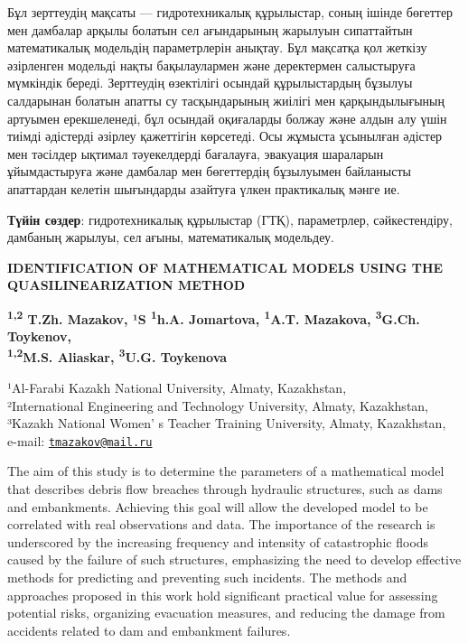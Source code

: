 Бұл зерттеудің мақсаты --- гидротехникалық құрылыстар, соның ішінде
бөгеттер мен дамбалар арқылы болатын сел ағындарының жарылуын
сипаттайтын математикалық модельдің параметрлерін анықтау. Бұл мақсатқа
қол жеткізу әзірленген модельді нақты бақылаулармен және деректермен
салыстыруға мүмкіндік береді. Зерттеудің өзектілігі осындай
құрылыстардың бұзылуы салдарынан болатын апатты су тасқындарының жиілігі
мен қарқындылығының артуымен ерекшеленеді, бұл осындай оқиғаларды болжау
және алдын алу үшін тиімді әдістерді әзірлеу қажеттігін көрсетеді. Осы
жұмыста ұсынылған әдістер мен тәсілдер ықтимал тәуекелдерді бағалауға,
эвакуация шараларын ұйымдастыруға және дамбалар мен бөгеттердің
бұзылуымен байланысты апаттардан келетін шығындарды азайтуға үлкен
практикалық мәнге ие.

{\bfseries Түйін сөздер}: гидротехникалық құрылыстар (ГТҚ), параметрлер,
сәйкестендіру, дамбаның жарылуы, сел ағыны, математикалық модельдеу.

{\bfseries IDENTIFICATION OF MATHEMATICAL MODELS USING THE
QUASILINEARIZATION METHOD}

{\bfseries \textsuperscript{1,2} T.Zh. Mazakov\textsuperscript{\envelope }, ¹S
\textsuperscript{1}h.A. Jomartova, \textsuperscript{1}A.T. Mazakova,
\textsuperscript{3}G.Ch. Toykenov,\\
\textsuperscript{1,2}M.S. Aliaskar, \textsuperscript{3}U.G. Toykenova\\
}

¹Al-Farabi Kazakh National University, Almaty, Kazakhstan,\\
²International Engineering and Technology University, Almaty,
Kazakhstan,\\
³Kazakh National Women' s Teacher Training University,
Almaty, Kazakhstan,\\
e-mail: \href{mailto:tmazakov@mail.ru}{\nolinkurl{tmazakov@mail.ru}}

The aim of this study is to determine the parameters of a mathematical
model that describes debris flow breaches through hydraulic structures,
such as dams and embankments. Achieving this goal will allow the
developed model to be correlated with real observations and data. The
importance of the research is underscored by the increasing frequency
and intensity of catastrophic floods caused by the failure of such
structures, emphasizing the need to develop effective methods for
predicting and preventing such incidents. The methods and approaches
proposed in this work hold significant practical value for assessing
potential risks, organizing evacuation measures, and reducing the damage
from accidents related to dam and embankment failures.

